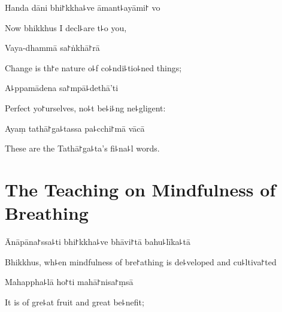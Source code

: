 
\begin{leader}
\end{leader}

Handa dāni bhi꜓kkha꜕ve āmant꜕ayāmi꜓ vo

\begin{english}
  Now bhikkhus I decl꜕are t꜕o you,
\end{english}

Vaya-dhammā sa꜓ṅkhā꜓rā

\begin{english}
  Change is th꜓e nature o꜕f co꜕ndi꜕tio꜕ned things;
\end{english}

A꜕ppamādena sa꜓mpā꜕dethā'ti


\begin{english}
  Perfect yo꜓urselves, no꜕t be꜕i꜕ng ne꜕gligent:
\end{english}

Ayaṃ tathā꜓ga꜕tassa pa꜕cchi꜓mā vācā

\begin{english}
  These are the Tathā꜓ga꜕ta's fi꜕na꜕l words.
\end{english}

\chapter{The Teaching on Mindfulness of Breathing}%


\begin{leader}
\end{leader}

Ānāpāna꜓ssa꜕ti bhi꜓kkha꜕ve bhāvi꜓tā bahu꜕līka꜕tā

\begin{english}
  Bhikkhus, wh꜕en mindfulness of bre꜓athing is de꜕veloped and cu꜕ltiva꜓ted
\end{english}

Mahappha꜕lā ho꜓ti mahā꜓nisa꜓ṃsā

\begin{english}
  It is of gre꜕at fruit and great be꜕nefit;
\end{english}


